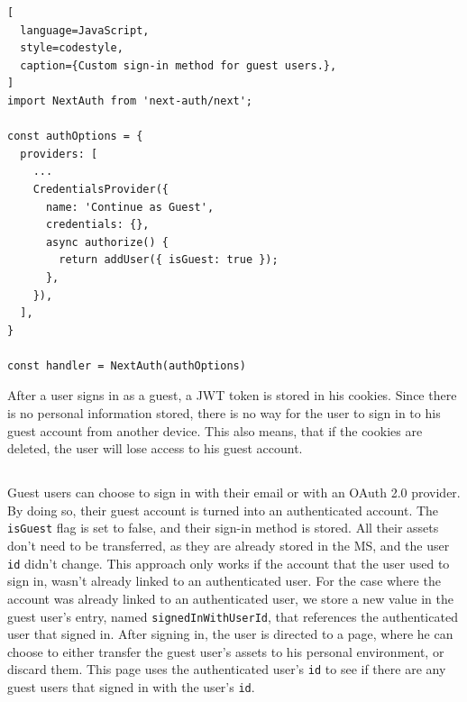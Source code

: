 \begin{lstlisting}[
  language=JavaScript,
  style=codestyle,
  caption={Custom sign-in method for guest users.},
]
import NextAuth from 'next-auth/next';

const authOptions = {
  providers: [
    ...
    CredentialsProvider({
      name: 'Continue as Guest',
      credentials: {},
      async authorize() {
        return addUser({ isGuest: true });
      },
    }),
  ],
}

const handler = NextAuth(authOptions)
\end{lstlisting}

After a user signs in as a guest, a JWT token is stored in his cookies.
Since there is no personal information stored, there is no way for the user to sign in to
his guest account from another device.
This also means, that if the cookies are deleted, the user will lose access to his guest account.

\subsection{}
\label{cha:ms-architecture:merge-guest-user-data}

Guest users can choose to sign in with their email or with an OAuth 2.0 provider.
By doing so, their guest account is turned into an authenticated account.
The \lstinline{isGuest} flag is set to false, and their sign-in method is stored.
All their assets don't need to be transferred, as they are already stored in the MS, and
the user \lstinline{id} didn't change.
This approach only works if the account that the user used to sign in, wasn't already
linked to an authenticated user.
For the case where the account was already linked to an authenticated user, we store a new
value in the guest user's entry, named \lstinline{signedInWithUserId},
that references the authenticated user that signed in.
After signing in, the user is directed to a page, where he can choose to either transfer the
guest user's assets to his personal environment, or discard them.
This page uses the authenticated user's \lstinline{id} to see if there are any guest users
that signed in with the user's \lstinline{id}.


